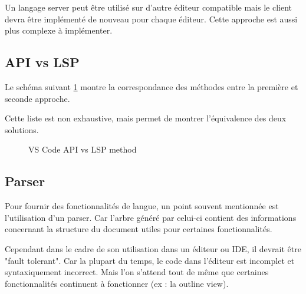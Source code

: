 \documentclass[
    iict, %
    il, %
]{heig-tb}
\begin{document}
Un langage server peut être utilisé sur d'autre éditeur compatible mais le client devra être implémenté de nouveau pour chaque éditeur.
Cette approche est aussi plus complexe à implémenter.

\subsection{API vs LSP}\label{api vs lsp}

Le schéma suivant \ref{api vs lsp} montre la correspondance des méthodes entre la première et seconde approche.

Cette liste est non exhaustive, mais permet de montrer l'équivalence des deux solutions.

\begin{figure}[!ht]
    \begin{center}
    \end{center}
    \caption[API vs LSP]{\label{api vs lsp} VS Code API vs LSP method}
\end{figure}

\subsection{Parser}

Pour fournir des fonctionnalités de langue, un point souvent mentionnée est l'utilisation d'un parser.
Car l'arbre généré par celui-ci contient des informations concernant la structure du document utiles pour certaines fonctionnalités.

Cependant dans le cadre de son utilisation dans un éditeur ou IDE, il devrait être "fault tolerant".
Car la plupart du temps, le code dans l'éditeur est incomplet et syntaxiquement incorrect.
Mais l'on s'attend tout de même que certaines fonctionnalités continuent à fonctionner (ex : la outline view).
\end{document}
